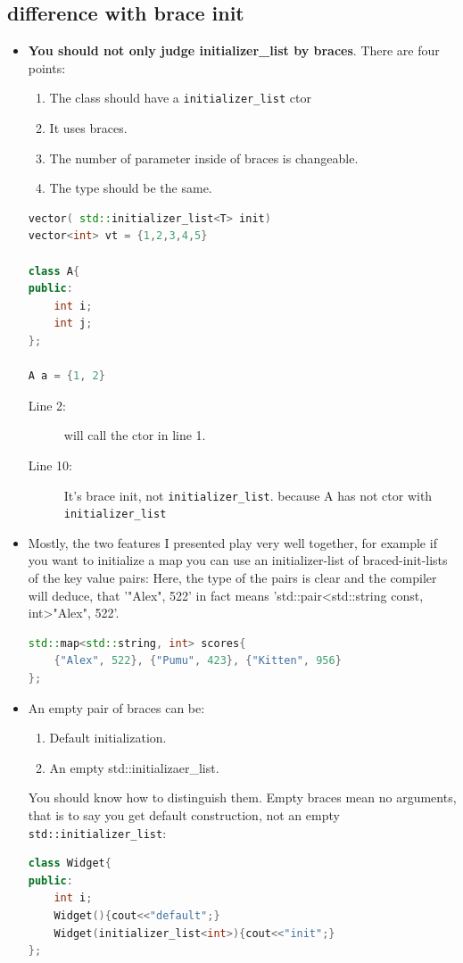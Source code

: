 \documentclass[a4paper,11pt,twoside]{book}
\begin{document}
\subsection{difference with brace init}
\begin{itemize}
	\item  \textbf{You should not only judge initializer\_list by braces}. There are four points:
	\begin{enumerate}
		\item The class should have a \texttt{initializer\_list} ctor 
		\item It uses braces.
		\item The number of parameter inside of braces is changeable. 
		\item The type should be the same.
	\end{enumerate}

\begin{lstlisting}[frame=single, language=c++,mathescape=true]
vector( std::initializer_list<T> init)
vector<int> vt = {1,2,3,4,5}  
	
class A{
public:
	int i;
	int j;
};
	
A a = {1, 2} 
\end{lstlisting}
\begin{description}
	\item[Line 2:] will call the ctor in line 1.
	\item[Line 10:] It's brace init, not \texttt{initializer\_list}. because A has not ctor with \texttt{initializer\_list}
\end{description}
	
	\item Mostly, the two features I presented play very well together, for example if you want to initialize a map you can use an initializer-list of braced-init-lists of the key value pairs: Here, the type of the pairs is clear and the compiler will deduce, that '{"Alex", 522}' in fact means 'std::pair<std::string const, int>{"Alex", 522}'.
	
\begin{lstlisting}[frame=single, language=c++,mathescape=true]
std::map<std::string, int> scores{ 
	{"Alex", 522}, {"Pumu", 423}, {"Kitten", 956} 
};
\end{lstlisting}

	\item An empty pair of braces can be:
	\begin{enumerate}
		\item Default initialization.
		\item An empty std::initializaer\_list.
	\end{enumerate}
	You should know how to distinguish them.  Empty braces mean no arguments, that is to say you get default construction, not an empty \texttt{std::initializer\_list}:
\begin{lstlisting}[frame=single, language=c++,mathescape=true]
class Widget{
public:
	int i;
	Widget(){cout<<"default";}
	Widget(initializer_list<int>){cout<<"init";}
};
	

\end{lstlisting}
\end{itemize}
\end{document}

